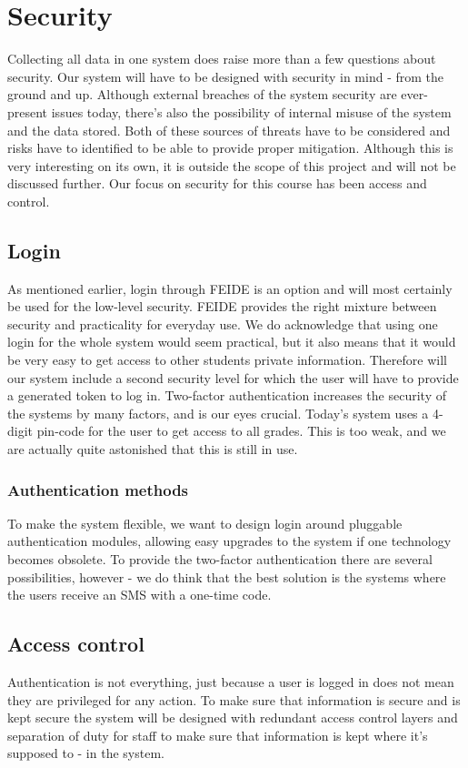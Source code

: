 \section{Security}

Collecting all data in one system does raise more than a few questions about security. Our system will have to be designed with security in mind - from the ground and up. 
Although external breaches of the system security are ever-present issues today, there's also the possibility of internal misuse of the system and the data stored. Both of these 
sources of threats have to be considered and risks have to identified to be able to provide proper mitigation. Although this is very interesting on its own, it is outside the scope 
of this project and will not be discussed further. Our focus on security for this course has been access and control.

\subsection{Login}
As mentioned earlier, login through FEIDE is an option and will most certainly be used for the low-level security. FEIDE provides the right mixture between security and practicality for everyday use. We do acknowledge that using one login for the whole system would seem practical, but it also means that it would be very easy to get access to other students private information. Therefore will our system include a second security level for which the user will have to provide a generated token to log in. Two-factor authentication increases the security of the systems by many factors, and is our eyes crucial. Today's system uses a 4-digit pin-code for the user to get access to all grades. This is too weak, and we are actually quite astonished that this is still in use. 

\subsubsection{Authentication methods}
To make the system flexible, we want to design login around pluggable authentication modules, allowing easy upgrades to the system if one technology becomes obsolete. To provide the 
two-factor authentication there are several possibilities, however - we do think that the best solution is the systems where the users receive an SMS with a one-time code. 

\subsection{Access control}
Authentication is not everything, just because a user is logged in does not mean they are privileged for any action. To make sure that information is secure and is kept secure the system will be designed with redundant access control layers and separation of duty for staff to make sure that information is kept where it's supposed to - in the system. 